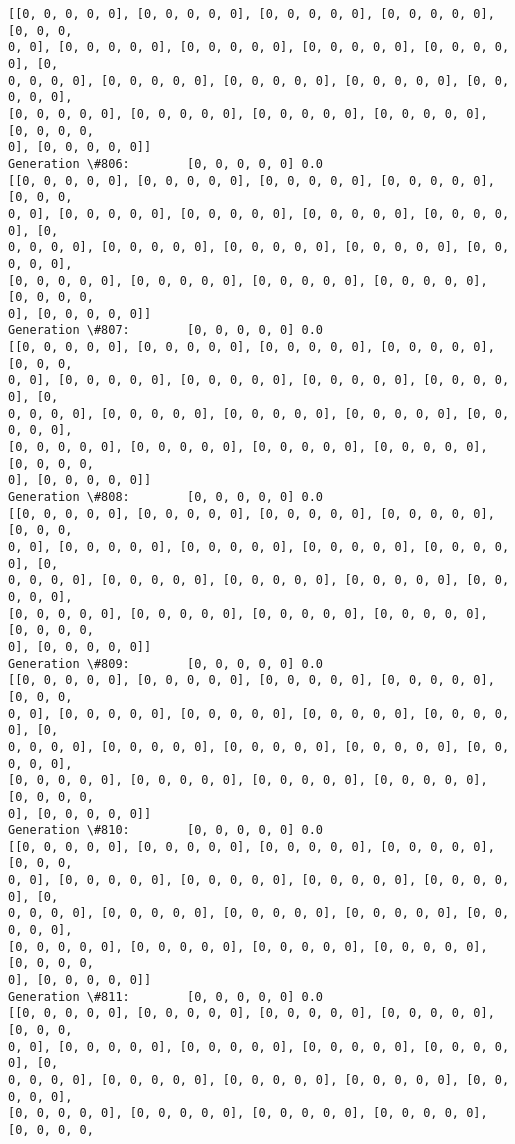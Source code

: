 \documentclass[11pt]{article}
\begin{document}
\begin{Verbatim}[commandchars=\\\{\}]
[[0, 0, 0, 0, 0], [0, 0, 0, 0, 0], [0, 0, 0, 0, 0], [0, 0, 0, 0, 0], [0, 0, 0,
0, 0], [0, 0, 0, 0, 0], [0, 0, 0, 0, 0], [0, 0, 0, 0, 0], [0, 0, 0, 0, 0], [0,
0, 0, 0, 0], [0, 0, 0, 0, 0], [0, 0, 0, 0, 0], [0, 0, 0, 0, 0], [0, 0, 0, 0, 0],
[0, 0, 0, 0, 0], [0, 0, 0, 0, 0], [0, 0, 0, 0, 0], [0, 0, 0, 0, 0], [0, 0, 0, 0,
0], [0, 0, 0, 0, 0]]
Generation \#806:        [0, 0, 0, 0, 0] 0.0
[[0, 0, 0, 0, 0], [0, 0, 0, 0, 0], [0, 0, 0, 0, 0], [0, 0, 0, 0, 0], [0, 0, 0,
0, 0], [0, 0, 0, 0, 0], [0, 0, 0, 0, 0], [0, 0, 0, 0, 0], [0, 0, 0, 0, 0], [0,
0, 0, 0, 0], [0, 0, 0, 0, 0], [0, 0, 0, 0, 0], [0, 0, 0, 0, 0], [0, 0, 0, 0, 0],
[0, 0, 0, 0, 0], [0, 0, 0, 0, 0], [0, 0, 0, 0, 0], [0, 0, 0, 0, 0], [0, 0, 0, 0,
0], [0, 0, 0, 0, 0]]
Generation \#807:        [0, 0, 0, 0, 0] 0.0
[[0, 0, 0, 0, 0], [0, 0, 0, 0, 0], [0, 0, 0, 0, 0], [0, 0, 0, 0, 0], [0, 0, 0,
0, 0], [0, 0, 0, 0, 0], [0, 0, 0, 0, 0], [0, 0, 0, 0, 0], [0, 0, 0, 0, 0], [0,
0, 0, 0, 0], [0, 0, 0, 0, 0], [0, 0, 0, 0, 0], [0, 0, 0, 0, 0], [0, 0, 0, 0, 0],
[0, 0, 0, 0, 0], [0, 0, 0, 0, 0], [0, 0, 0, 0, 0], [0, 0, 0, 0, 0], [0, 0, 0, 0,
0], [0, 0, 0, 0, 0]]
Generation \#808:        [0, 0, 0, 0, 0] 0.0
[[0, 0, 0, 0, 0], [0, 0, 0, 0, 0], [0, 0, 0, 0, 0], [0, 0, 0, 0, 0], [0, 0, 0,
0, 0], [0, 0, 0, 0, 0], [0, 0, 0, 0, 0], [0, 0, 0, 0, 0], [0, 0, 0, 0, 0], [0,
0, 0, 0, 0], [0, 0, 0, 0, 0], [0, 0, 0, 0, 0], [0, 0, 0, 0, 0], [0, 0, 0, 0, 0],
[0, 0, 0, 0, 0], [0, 0, 0, 0, 0], [0, 0, 0, 0, 0], [0, 0, 0, 0, 0], [0, 0, 0, 0,
0], [0, 0, 0, 0, 0]]
Generation \#809:        [0, 0, 0, 0, 0] 0.0
[[0, 0, 0, 0, 0], [0, 0, 0, 0, 0], [0, 0, 0, 0, 0], [0, 0, 0, 0, 0], [0, 0, 0,
0, 0], [0, 0, 0, 0, 0], [0, 0, 0, 0, 0], [0, 0, 0, 0, 0], [0, 0, 0, 0, 0], [0,
0, 0, 0, 0], [0, 0, 0, 0, 0], [0, 0, 0, 0, 0], [0, 0, 0, 0, 0], [0, 0, 0, 0, 0],
[0, 0, 0, 0, 0], [0, 0, 0, 0, 0], [0, 0, 0, 0, 0], [0, 0, 0, 0, 0], [0, 0, 0, 0,
0], [0, 0, 0, 0, 0]]
Generation \#810:        [0, 0, 0, 0, 0] 0.0
[[0, 0, 0, 0, 0], [0, 0, 0, 0, 0], [0, 0, 0, 0, 0], [0, 0, 0, 0, 0], [0, 0, 0,
0, 0], [0, 0, 0, 0, 0], [0, 0, 0, 0, 0], [0, 0, 0, 0, 0], [0, 0, 0, 0, 0], [0,
0, 0, 0, 0], [0, 0, 0, 0, 0], [0, 0, 0, 0, 0], [0, 0, 0, 0, 0], [0, 0, 0, 0, 0],
[0, 0, 0, 0, 0], [0, 0, 0, 0, 0], [0, 0, 0, 0, 0], [0, 0, 0, 0, 0], [0, 0, 0, 0,
0], [0, 0, 0, 0, 0]]
Generation \#811:        [0, 0, 0, 0, 0] 0.0
[[0, 0, 0, 0, 0], [0, 0, 0, 0, 0], [0, 0, 0, 0, 0], [0, 0, 0, 0, 0], [0, 0, 0,
0, 0], [0, 0, 0, 0, 0], [0, 0, 0, 0, 0], [0, 0, 0, 0, 0], [0, 0, 0, 0, 0], [0,
0, 0, 0, 0], [0, 0, 0, 0, 0], [0, 0, 0, 0, 0], [0, 0, 0, 0, 0], [0, 0, 0, 0, 0],
[0, 0, 0, 0, 0], [0, 0, 0, 0, 0], [0, 0, 0, 0, 0], [0, 0, 0, 0, 0], [0, 0, 0, 0,

\end{Verbatim}
\end{document}
